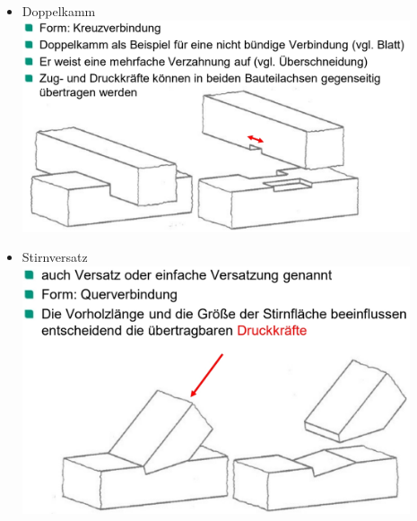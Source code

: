 \documentclass[fleqn,twoside]{article}
\begin{document}
\begin{minipage}{0.45\textwidth}
\begin{itemize}
                    \item Doppelkamm\\
                        \includegraphics[width=0.9\textwidth]{Grafiken/Zimmermansmaessige Verbindungen/Verbindungsarten/Doppelkamm.jpg}\\
                    \item Stirnversatz\\
                        \includegraphics[width=0.9\textwidth]{Grafiken/Zimmermansmaessige Verbindungen/Verbindungsarten/Stirnversatz.jpg}\\
        \end{itemize}
    \end{minipage}
\end{document}
